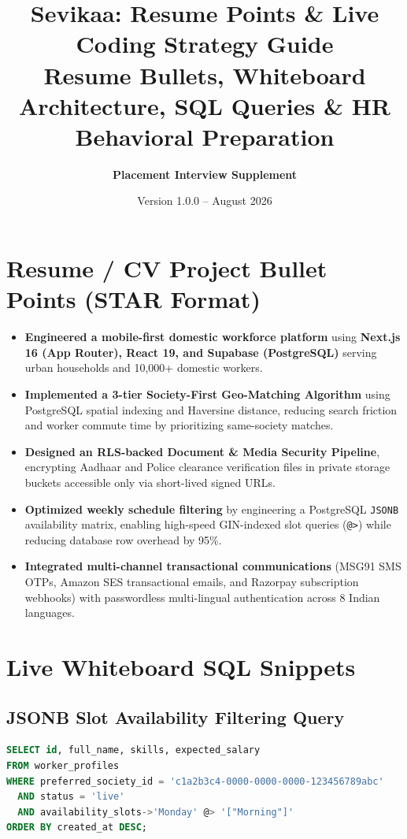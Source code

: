 \documentclass[11pt,a4paper]{article}
\title{\textbf{\huge Sevikaa: Resume Points \& Live Coding Strategy Guide}\\[0.5em]
\large Resume Bullets, Whiteboard Architecture, SQL Queries \& HR Behavioral Preparation}
\author{\textbf{Placement Interview Supplement}}
\date{Version 1.0.0 -- August 2026}
\begin{document}
\maketitle

\section{Resume / CV Project Bullet Points (STAR Format)}
\begin{itemize}[noitemsep]
    \item \textbf{Engineered a mobile-first domestic workforce platform} using \textbf{Next.js 16 (App Router), React 19, and Supabase (PostgreSQL)} serving urban households and 10,000+ domestic workers.
    \item \textbf{Implemented a 3-tier Society-First Geo-Matching Algorithm} using PostgreSQL spatial indexing and Haversine distance, reducing search friction and worker commute time by prioritizing same-society matches.
    \item \textbf{Designed an RLS-backed Document \& Media Security Pipeline}, encrypting Aadhaar and Police clearance verification files in private storage buckets accessible only via short-lived signed URLs.
    \item \textbf{Optimized weekly schedule filtering} by engineering a PostgreSQL \texttt{JSONB} availability matrix, enabling high-speed GIN-indexed slot queries (\texttt{@>}) while reducing database row overhead by 95\%.
    \item \textbf{Integrated multi-channel transactional communications} (MSG91 SMS OTPs, Amazon SES transactional emails, and Razorpay subscription webhooks) with passwordless multi-lingual authentication across 8 Indian languages.
\end{itemize}

\section{Live Whiteboard SQL Snippets}

\subsection{JSONB Slot Availability Filtering Query}
\begin{lstlisting}[language=SQL]
SELECT id, full_name, skills, expected_salary
FROM worker_profiles
WHERE preferred_society_id = 'c1a2b3c4-0000-0000-0000-123456789abc'
  AND status = 'live'
  AND availability_slots->'Monday' @> '["Morning"]'
ORDER BY created_at DESC;
\end{lstlisting}
\end{document}
